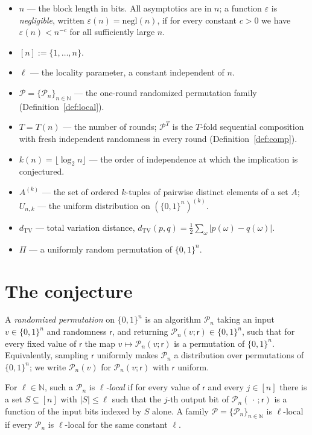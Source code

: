 \documentclass{aicr-conjecture}
\newcommand{\bits}{\{0,1\}}
\newcommand{\NN}{\mathbb{N}}
\newcommand{\cP}{\mathcal{P}}
\newcommand{\negl}{\mathrm{negl}}
\newcommand{\dTV}{d_{\mathrm{TV}}}
\newcommand{\rnd}{\mathsf{r}}
\begin{document}
\begin{itemize}
\item $n$ --- the block length in bits. All asymptotics are in $n$; a
  function $\varepsilon$ is \emph{negligible}, written
  $\varepsilon(n) = \negl(n)$, if for every constant $c > 0$ we have
  $\varepsilon(n) < n^{-c}$ for all sufficiently large $n$.
\item $[n] := \{1,\dots,n\}$.
\item $\ell$ --- the locality parameter, a constant independent of $n$.
\item $\cP = \{\cP_n\}_{n \in \NN}$ --- the one-round randomized
  permutation family (Definition~\ref{def:local}).
\item $T = T(n)$ --- the number of rounds; $\cP^{T}$ is the $T$-fold
  sequential composition with fresh independent randomness in every
  round (Definition~\ref{def:comp}).
\item $k(n) = \lfloor \log_2 n \rfloor$ --- the order of independence at
  which the implication is conjectured.
\item $A^{(k)}$ --- the set of ordered $k$-tuples of pairwise distinct
  elements of a set $A$; $U_{n,k}$ --- the uniform distribution on
  $(\bits^n)^{(k)}$.
\item $\dTV$ --- total variation distance,
  $\dTV(p,q) = \tfrac{1}{2}\sum_{\omega}|p(\omega) - q(\omega)|$.
\item $\Pi$ --- a uniformly random permutation of $\bits^n$.
\end{itemize}

\section{The conjecture}\label{sec:conjectures}

\begin{definition}
\label{def:local}
A \emph{randomized permutation} on $\bits^n$ is an algorithm $\cP_n$
taking an input $v \in \bits^n$ and randomness $\rnd$, and returning
$\cP_n(v;\rnd) \in \bits^n$, such that for every fixed value of $\rnd$
the map $v \mapsto \cP_n(v;\rnd)$ is a permutation of $\bits^n$.
Equivalently, sampling $\rnd$ uniformly makes $\cP_n$ a distribution
over permutations of $\bits^n$; we write $\cP_n(v)$ for $\cP_n(v;\rnd)$
with $\rnd$ uniform.

For $\ell \in \NN$, such a $\cP_n$ is \emph{$\ell$-local} if for every
value of $\rnd$ and every $j \in [n]$ there is a set $S \subseteq [n]$
with $|S| \le \ell$ such that the $j$-th output bit of
$\cP_n(\,\cdot\,;\rnd)$ is a function of the input bits indexed by $S$
alone. A family $\cP = \{\cP_n\}_{n \in \NN}$ is $\ell$-local if every
$\cP_n$ is $\ell$-local for the same constant $\ell$.
\end{definition}
\end{document}
